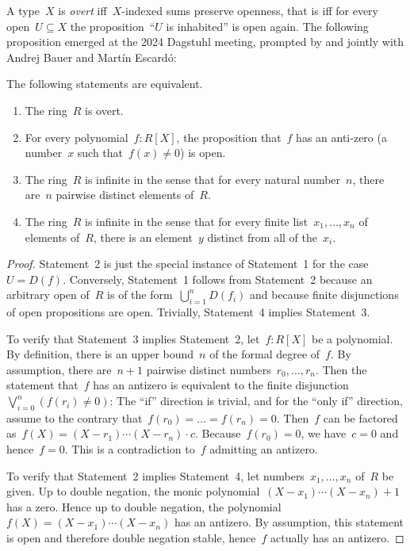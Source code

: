 A type~$X$ is \emph{overt} iff~$X$-indexed sums preserve openness, that is iff
for every open~$U \subseteq X$ the proposition~``$U$ is inhabited'' is open again. The
following proposition emerged at the 2024 Dagstuhl meeting, prompted by and
jointly with Andrej Bauer and Martín Escardó:

\begin{proposition}\label{r-overt}
The following statements are equivalent.
\begin{enumerate}
\item The ring~$R$ is overt.
\item For every polynomial~$f : R[X]$, the proposition that~$f$ has an
anti-zero (a number~$x$ such that~$f(x) \neq 0$) is open.
\item The ring~$R$ is infinite in the sense that for every natural number~$n$,
there are~$n$ pairwise distinct elements of~$R$.
\item The ring~$R$ is infinite in the sense that for every finite
list~$x_1,\ldots,x_n$ of elements of~$R$, there is an element~$y$
distinct from all of the~$x_i$.
\end{enumerate}
\end{proposition}

\begin{proof}Statement~2 is just the special instance of Statement~1 for the
case~$U = D(f)$. Conversely, Statement~1 follows from Statement~2 because
an arbitrary open of~$R$ is of the form~$\bigcup_{i=1}^n D(f_i)$ and because
finite disjunctions of open propositions are open. Trivially, Statement~4
implies Statement~3.

To verify that Statement~3 implies Statement~2, let~$f : R[X]$ be a polynomial.
By definition, there is an upper bound~$n$ of the formal degree of~$f$. By
assumption, there are~$n+1$ pairwise distinct numbers~$r_0,\ldots,r_n$. Then the
statement that~$f$ has an antizero is equivalent to the finite
disjunction~$\bigvee_{i=0}^n (f(r_i) \neq 0)$: The ``if'' direction is trivial,
and for the ``only if'' direction, assume to the contrary that~$f(r_0) = \ldots
= f(r_n) = 0$. Then~$f$ can be factored as~$f(X) = (X-r_1)\cdots(X-r_n) \cdot
c$. Because~$f(r_0) = 0$, we have~$c = 0$ and hence~$f = 0$. This is a
contradiction to~$f$ admitting an antizero.

To verify that Statement~2 implies Statement~4, let numbers~$x_1,\ldots,x_n$
of~$R$ be given. Up to double negation, the monic
polynomial~$(X-x_1)\cdots(X-x_n)+1$ has a zero. Hence up to double negation,
the polynomial~$f(X) = (X-x_1)\cdots(X-x_n)$ has an antizero. By assumption,
this statement is open and therefore double negation stable, hence~$f$ actually
has an antizero.
\end{proof}

